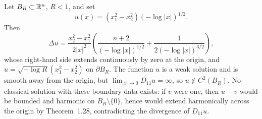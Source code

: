 \begin{example}\label{hanlin:weaksol-part1-example-3-12}
Let $B_R\subset\mathbb{R}^n$, $R<1$, and set
\[
u(x)=(x_1^2-x_2^2)(-\log|x|)^{1/2}.
\]
Then
\[
\Delta u=
\frac{x_2^2-x_1^2}{2|x|^2}
\left(\frac{n+2}{(-\log|x|)^{1/2}}
+\frac{1}{2(-\log|x|)^{3/2}}\right),
\]
whose right-hand side extends continuously by zero at the origin, and
$u=\sqrt{-\log R}(x_1^2-x_2^2)$ on $\partial B_R$. The function $u$ is a
weak solution and is smooth away from the origin, but
$\lim_{|x|\to0}D_{11}u=\infty$, so $u\notin C^2(B_R)$. No classical
solution with these boundary data exists: if $v$ were one, then $u-v$ would
be bounded and harmonic on $B_R\setminus\{0\}$, hence would extend
harmonically across the origin by Theorem~1.28, contradicting the divergence
of $D_{11}u$.
\end{example}
